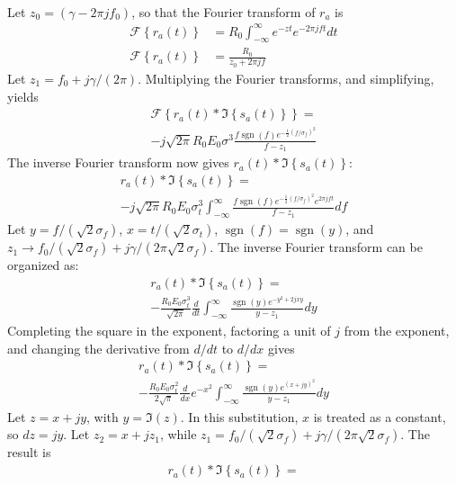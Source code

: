 \documentclass[amsmath,amssymb,aps,prd,10pt,twocolumn,showkeys]{revtex4}
\DeclareMathOperator{\sgn}{sgn}
\begin{document}
\begin{itemize}
\begin{align}
\end{align}
Let $z_0 = (\gamma - 2\pi jf_0)$, so that the Fourier transform of $r_a$ is 
\begin{align}
\mathcal{F}\left\lbrace r_a(t)\right\rbrace &= R_0\int_{-\infty}^{\infty} e^{-zt} e^{-2\pi j ft} dt \\
\mathcal{F}\left\lbrace r_a(t)\right\rbrace &= \frac{R_0}{z_0+2\pi j f}
\end{align}
Let $z_1 = f_0 + j\gamma/(2\pi)$. Multiplying the Fourier transforms, and simplifying, yields
\begin{multline}
\mathcal{F}\left\lbrace r_a(t) * \Im\left\lbrace s_a(t)\right\rbrace \right\rbrace = \\ -j \sqrt{2\pi} R_0 E_0 \sigma^3 \frac{f\sgn(f) e^{-\frac{1}{2}(f/\sigma_f)^2}}{f-z_1}
\end{multline}
The inverse Fourier transform now gives $r_a(t) * \Im\left\lbrace s_a(t) \right\rbrace$:
\begin{multline}
r_a(t) * \Im\left\lbrace s_a(t) \right\rbrace = \\
-j\sqrt{2\pi} R_0 E_0 \sigma_t^3 \int_{-\infty}^{\infty} \frac{f\sgn(f)e^{-\frac{1}{2}(f/\sigma_f)^2}e^{2\pi jft}}{f-z_1} df
\end{multline}
Let $y = f/(\sqrt{2}\sigma_f)$, $x=t/(\sqrt{2}\sigma_t)$, $\sgn(f) = \sgn(y)$, and $z_1 \to f_0/(\sqrt{2}\sigma_f) + j\gamma/(2\pi \sqrt{2} \sigma_f)$.  The inverse Fourier transform can be organized as:
\begin{multline}
r_a(t) * \Im\left\lbrace s_a(t) \right\rbrace = \\
-\frac{R_0E_0\sigma_t^3}{\sqrt{2\pi}}\frac{d}{dt}\int_{-\infty}^{\infty} \frac{\sgn(y) e^{-y^2+2jxy}}{y-z_1} dy
\end{multline}
Completing the square in the exponent, factoring a unit of $j$ from the exponent, and changing the derivative from $d/dt$ to $d/dx$ gives
\begin{multline}
r_a(t) * \Im\left\lbrace s_a(t) \right\rbrace = \\
-\frac{R_0E_0\sigma_t^2}{2\sqrt{\pi}}\frac{d}{dx}e^{-x^2} \int_{-\infty}^{\infty} \frac{\sgn(y) e^{(x+jy)^2}}{y-z_1}dy
\end{multline}
Let $z = x+jy$, with $y = \Im(z)$.  In this substitution, $x$ is treated as a constant, so $dz = jy$.  Let $z_2 = x+j z_1$, while $z_1 = f_0/(\sqrt{2}\sigma_f) + j\gamma/(2\pi \sqrt{2} \sigma_f)$.  The result is
\begin{multline}
r_a(t) * \Im\left\lbrace s_a(t) \right\rbrace = \\

\end{multline}
\end{itemize}
\end{document}
